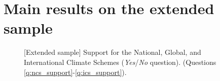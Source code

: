 \clearpage
\section{Main results on the extended sample}\label{app:extended}




\begin{figure}[h!]
    \caption[{[}Extended sample{]} Support for the NCS, GCS, ICS]{[Extended sample] Support for the National, Global, and International Climate Schemes (\textit{Yes}/\textit{No} question). \hfill (Questions \ref{q:ncs_support}-\ref{q:ics_support}).
    }\label{fig:ics_extended}
\end{figure}

